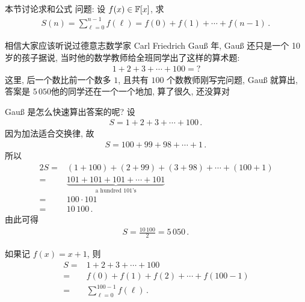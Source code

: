 \subsection*{\SummationFormulae}
\markright{\SummationFormulae}

本节讨论求和公式  问题: 设 $f(x) \in \mathbb{F}[x]$, 求
\begin{align*}
    S(n) = \sum_{\ell = 0}^{n - 1} f(\ell) = f(0) + f(1) + \cdots + f(n - 1) \period
\end{align*}

\begin{example}
    相信大家应该听说过德意志数学家 Carl Friedrich Gauß 年, Gauß 还只是一个 10 岁的孩子\period 据说, 当时他的数学教师给全班同学出了这样的算术题:
    \begin{align*}
        1 + 2 + 3 + \cdots + 100 = ?
    \end{align*}
    这里, 后一个数比前一个数多 $1$, 且共有 $100$ 个数\period 教师刚写完问题, Gauß 就算出, 答案是 $5\,050$\period 他的同学还在一个一个地加, 算了很久, 还没算对\period

    Gauß 是怎么快速算出答案的呢? 设
    \begin{align*}
        S = 1 + 2 + 3 + \cdots + 100 \period
    \end{align*}
    因为加法适合交换律, 故
    \begin{align*}
        S = 100 + 99 + 98 + \cdots + 1 \period
    \end{align*}
    所以
    \begin{align*}
        2S
        = {} & (1 + 100) + (2 + 99) + (3 + 98) + \cdots + (100 + 1) \\
        = {} & \underbrace{101 + 101 + 101 + \cdots + 101}
        _{\text{a hundred $101$'s}}                                 \\
        = {} & 100 \cdot 101                                        \\
        = {} & 10\,100 \period
    \end{align*}
    由此可得
    \begin{align*}
        S = \frac{10\,100}{2} = 5\,050 \period
    \end{align*}

    如果记 $f(x) = x + 1$, 则
    \begin{align*}
        S
        = {} & 1 + 2 + 3 + \cdots + 100                  \\
        = {} & f(0) + f(1) + f(2) + \cdots + f(100 - 1)  \\
        = {} & \sum_{\ell = 0}^{100 - 1} f(\ell) \period
    \end{align*}


\end{example}
